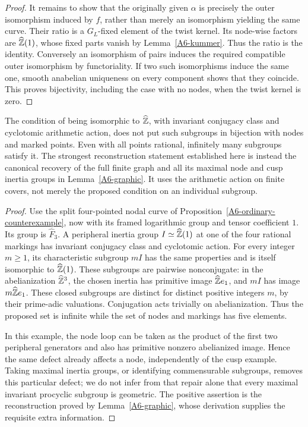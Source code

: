 \begin{proof}
It remains to show that the originally given $\alpha$ is precisely the outer isomorphism induced by $f$, rather than merely an isomorphism yielding the same curve. Their ratio is a $G_L$-fixed element of the twist kernel. Its node-wise factors are $\widehat{{\mathbb{Z}}}(1)$, whose fixed parts vanish by Lemma~\ref{A6-kummer}. Thus the ratio is the identity. Conversely an isomorphism of pairs induces the required compatible outer isomorphism by functoriality. If two such isomorphisms induce the same one, smooth anabelian uniqueness on every component shows that they coincide. This proves bijectivity, including the case with no nodes, when the twist kernel is zero.
\end{proof}

\begin{proposition}\label{A6-procyclic}
The condition of being isomorphic to $\widehat{{\mathbb{Z}}}$, with invariant conjugacy class and cyclotomic arithmetic action, does not put such subgroups in bijection with nodes and marked points. Even with all points rational, infinitely many subgroups satisfy it. The strongest reconstruction statement established here is instead the canonical recovery of the full finite graph and all its maximal node and cusp inertia groups in Lemma~\ref{A6-graphic}. It uses the arithmetic action on finite covers, not merely the proposed condition on an individual subgroup.
\end{proposition}
\begin{proof}
Use the split four-pointed nodal curve of Proposition~\ref{A6-ordinary-counterexample}, now with its framed logarithmic group and tensor coefficient $1$. Its group is $\widehat{F}_3$. A peripheral inertia group $I\simeq\widehat{{\mathbb{Z}}}(1)$ at one of the four rational markings has invariant conjugacy class and cyclotomic action. For every integer $m\ge1$, its characteristic subgroup $mI$ has the same properties and is itself isomorphic to $\widehat{{\mathbb{Z}}}(1)$. These subgroups are pairwise nonconjugate: in the abelianization $\widehat{{\mathbb{Z}}}^3$, the chosen inertia has primitive image $\widehat{{\mathbb{Z}}} e_1$, and $mI$ has image $m\widehat{{\mathbb{Z}}} e_1$. These closed subgroups are distinct for distinct positive integers $m$, by their prime-adic valuations. Conjugation acts trivially on abelianization. Thus the proposed set is infinite while the set of nodes and markings has five elements.

In this example, the node loop can be taken as the product of the first two peripheral generators and also has primitive nonzero abelianized image. Hence the same defect already affects a node, independently of the cusp example. Taking maximal inertia groups, or identifying commensurable subgroups, removes this particular defect; we do not infer from that repair alone that every maximal invariant procyclic subgroup is geometric. The positive assertion is the reconstruction proved by Lemma~\ref{A6-graphic}, whose derivation supplies the requisite extra information.
\end{proof}

